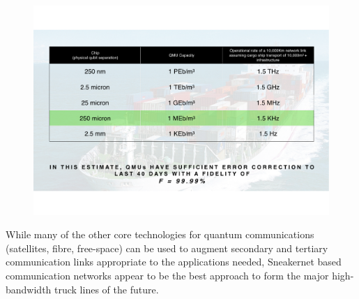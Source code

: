 \documentclass[twocolumn, aps, rmp, amsmath, amssymb, nofootinbib, superscriptaddress, longbibliography, floatfix, table-of-contents, eqsecnum]{revtex4-2}
\begin{document}
\begin{figure}[htbp!]
	\includegraphics[clip=true, width=\columnwidth]{link}
	\caption{} \label{fig:link}
\end{figure}

While many of the other core technologies for quantum communications (satellites, fibre, free-space) can be used to augment secondary and tertiary communication links appropriate to the applications needed, Sneakernet based communication networks appear to be the best approach to form the major high-bandwidth truck lines of the future. 



\printindex
\end{document}

